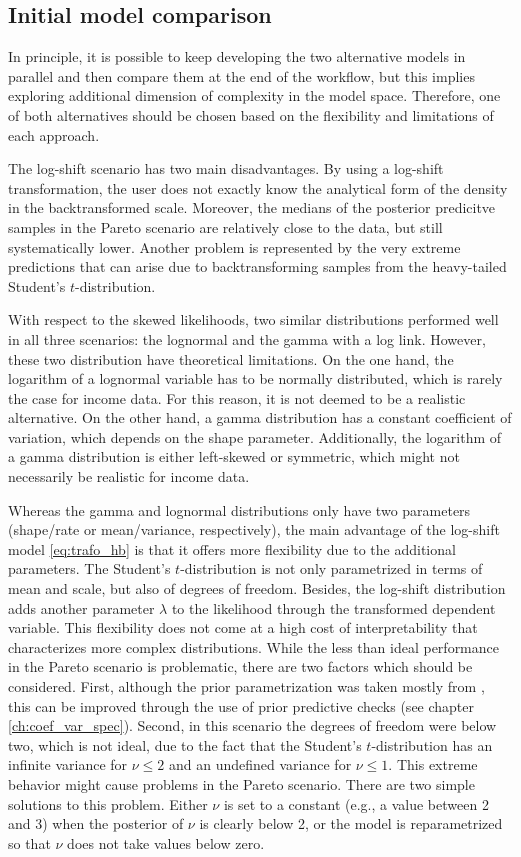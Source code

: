 \subsection{Initial model comparison}

In principle, it is possible to keep developing the two alternative models in parallel and then compare them at the end of the workflow, but this implies exploring additional dimension of complexity in the model space.
Therefore, one of both alternatives should be chosen based on the flexibility and limitations of each approach.

The log-shift scenario has two main disadvantages.
By using a log-shift transformation, the user does not exactly know the analytical form of the density in the backtransformed scale.
Moreover, the medians of the posterior predicitve samples in the Pareto scenario are relatively close to the data, but still systematically lower.
Another problem is represented by the very extreme predictions that can arise due to backtransforming samples from the heavy-tailed Student's $t$-distribution.

With respect to the skewed likelihoods, two similar distributions performed well in all three scenarios: the lognormal and the gamma with a log link.
However, these two distribution have theoretical limitations.
On the one hand, the logarithm of a lognormal variable has to be normally distributed, which is rarely the case for income data.
For this reason, it is not deemed to be a realistic alternative.
On the other hand, a gamma distribution has a constant coefficient of variation, which depends on the shape parameter.
Additionally, the logarithm of a gamma distribution is either left-skewed or symmetric, which might not necessarily be realistic for income data.

Whereas the gamma and lognormal distributions only have two parameters (shape/rate or mean/variance, respectively), the main advantage of the log-shift model \ref{eq:trafo_hb} is that it offers more flexibility due to the additional parameters.
The Student's $t$-distribution is not only parametrized in terms of mean and scale, but also of degrees of freedom.
Besides, the log-shift distribution adds another parameter $\lambda$ to the likelihood through the transformed dependent variable.
This flexibility does not come at a high cost of interpretability that characterizes more complex distributions.
While the less than ideal performance in the Pareto scenario is problematic, there are two factors which should be considered.
First, although the prior parametrization was taken mostly from \cite{morelli_hierarchical_2021},
this can be improved through the use of prior predictive checks (see chapter \ref{ch:coef_var_spec}).
Second, in this scenario the degrees of freedom were below two, which is not ideal, due to the fact that the Student's $t$-distribution has an infinite variance for $\nu \le 2$ and an undefined variance for $\nu \le 1$.
This extreme behavior might cause problems in the Pareto scenario.
There are two simple solutions to this problem.
Either $\nu$ is set to a constant (e.g., a value between 2 and 3) when the posterior of $\nu$ is clearly below 2, or the model is reparametrized so that $\nu$ does not take values below zero.


